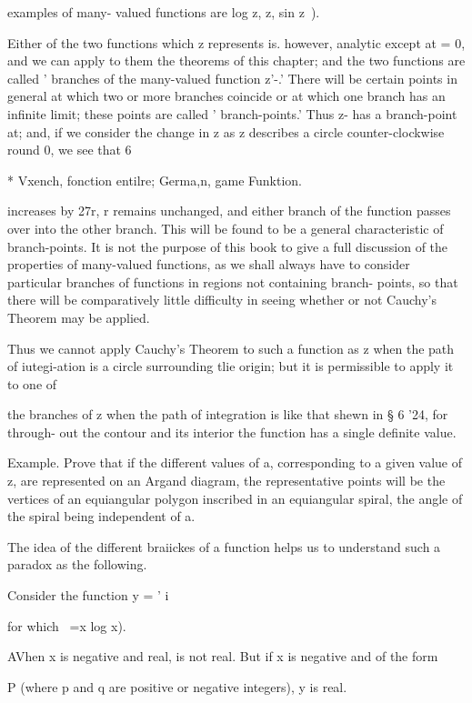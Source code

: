 {{{{examples of many- valued functions are log z, z, sin z~).

Either of the two functions which z represents is. however, analytic
except at = 0, and we can apply to them the theorems of this chapter;
and the two functions are called ' branches of the many-valued
function z'-.' There will be certain points in general at which two or
more branches coincide or at which one branch has an infinite limit;
these points are called ' branch-points.' Thus z- has a branch-point
at; and, if we consider the change in z as z describes a circle
counter-clockwise round 0, we see that 6

* Vxench, fonction entilre; Germa,n, game Funktion.

%
%

increases by 27r, r remains unchanged, and either branch of the
function passes over into the other branch. This will be found to be a
general characteristic of branch-points. It is not the purpose of this
book to give a full discussion of the properties of many-valued
functions, as we shall always have to consider particular branches of
functions in regions not containing branch- points, so that there will
be comparatively little difficulty in seeing whether or not Cauchy's
Theorem may be applied.

Thus we cannot apply Cauchy's Theorem to such a function as z when the
path of iutegi-ation is a circle surrounding tlie origin; but it is
permissible to apply it to one of

the branches of z when the path of integration is like that shewn in §
6 '24, for through- out the contour and its interior the function has
a single definite value.

Example. Prove that if the different values of a, corresponding to a
given value of z, are represented on an Argand diagram, the
representative points will be the vertices of an equiangular polygon
inscribed in an equiangular spiral, the angle of the spiral being
independent of a.

The idea of the different braiickes of a function helps us to
understand such a paradox as the following.

Consider the function y = ' i

for which ~=x log x).

AVhen x is negative and real, is not real. But if x is negative and of
the form

P (where p and q are positive or negative integers), y is real.

}}}}
